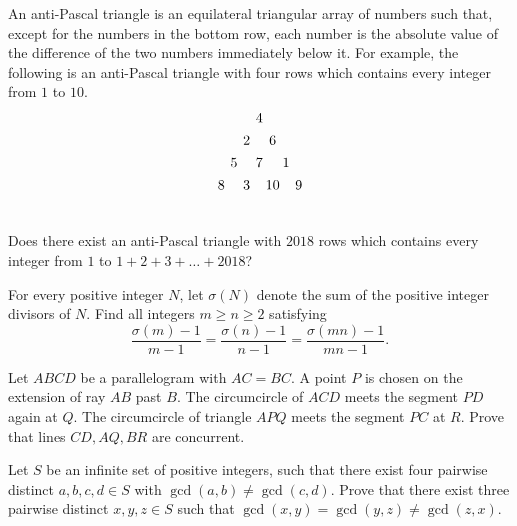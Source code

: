 \documentclass[11pt]{scrartcl}
\begin{document}
\begin{problem}[7494618588207758150]
	An anti-Pascal triangle is an equilateral triangular array of numbers such that, except for the numbers in the bottom row, each number is the absolute value of the difference of the two numbers immediately below it. For example, the following is an anti-Pascal triangle with four rows which contains every integer from $1$ to $10$.
\[\begin{array}{
c@{\hspace{4pt}}c@{\hspace{4pt}}
c@{\hspace{4pt}}c@{\hspace{2pt}}c@{\hspace{2pt}}c@{\hspace{4pt}}c
} \vspace{4pt}
 & & & 4 & & &  \\\vspace{4pt}
 & & 2 & & 6 & &  \\\vspace{4pt}
 & 5 & & 7 & & 1 & \\\vspace{4pt}
 8 & & 3 & & 10 & & 9 \\\vspace{4pt}
\end{array}\]Does there exist an anti-Pascal triangle with $2018$ rows which contains every integer from $1$ to $1 + 2 + 3 + \dots + 2018$?

\end{problem}
\begin{problem}[1612300762204186997]
For every positive integer $N$, let $\sigma(N)$ denote the sum of the positive integer divisors of $N$. Find all integers $m\geq n\geq 2$ satisfying\[\frac{\sigma(m)-1}{m-1}=\frac{\sigma(n)-1}{n-1}=\frac{\sigma(mn)-1}{mn-1}.\]
\end{problem}
\begin{problem}[682786464566571]
Let $ABCD$ be a parallelogram with $AC=BC.$ A point $P$ is chosen on the extension of ray $AB$ past $B.$ The circumcircle of $ACD$ meets the segment $PD$ again at $Q.$ The circumcircle of triangle $APQ$ meets the segment $PC$ at $R.$ Prove that lines $CD,AQ,BR$ are concurrent.
\end{problem}
\begin{problem}[6783316811528119504]
Let $S$ be an infinite set of positive integers, such that there exist four pairwise distinct $a,b,c,d \in S$ with $\gcd(a,b) \neq \gcd(c,d)$. Prove that there exist three pairwise distinct $x,y,z \in S$ such that $\gcd(x,y)=\gcd(y,z) \neq \gcd(z,x)$.
\end{problem}
\end{document}
